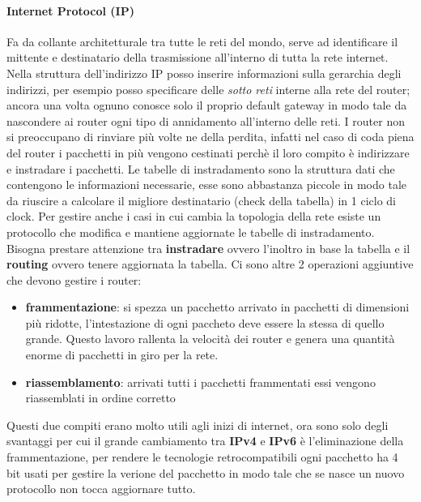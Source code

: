 \documentclass{article}
\begin{document}
\paragraph{Internet Protocol (IP)}
Fa da collante architetturale tra tutte le reti del mondo, serve ad
identificare il mittente e destinatario della trasmissione all'interno di tutta
la rete internet. Nella struttura dell'indirizzo IP posso inserire informazioni
sulla gerarchia degli indirizzi, per esempio posso specificare delle
\textit{sotto reti} interne alla rete del router; ancora una volta ognuno
conosce solo il proprio default gateway in modo tale da nascondere ai router
ogni tipo di annidamento all'interno delle reti. I router non si preoccupano di
rinviare più volte ne della perdita, infatti nel caso di coda piena del router
i pacchetti in più vengono cestinati perchè il loro compito è indirizzare e
instradare i pacchetti. Le tabelle di instradamento sono la struttura dati che
contengono le informazioni necessarie, esse sono abbastanza piccole in modo
tale da riuscire a calcolare il migliore destinatario (check della tabella) in
1 ciclo di clock. Per gestire anche i casi in cui cambia la topologia della
rete esiste un protocollo che modifica e mantiene aggiornate le tabelle di
instradamento. Bisogna prestare attenzione tra \textbf{instradare} ovvero
l'inoltro in base la tabella e il \textbf{routing} ovvero tenere aggiornata la
tabella. Ci sono altre 2 operazioni aggiuntive che devono gestire i router:

\begin{itemize}
    \item \textbf{frammentazione}: si spezza un pacchetto arrivato in pacchetti di dimensioni più ridotte,
          l'intestazione di ogni paccheto deve essere la stessa di quello grande.
          Questo lavoro rallenta la velocità dei router e genera una quantità enorme
          di pacchetti in giro per la rete.
    \item \textbf{riassemblamento}: arrivati tutti i pacchetti frammentati essi vengono riassemblati in ordine corretto
\end{itemize}

Questi due compiti erano molto utili agli inizi di internet, ora sono solo
degli svantaggi per cui il grande cambiamento tra \textbf{IPv4} e \textbf{IPv6}
è l'eliminazione della frammentazione, per rendere le tecnologie
retrocompatibili ogni pacchetto ha 4 bit usati per gestire la verione del
pacchetto in modo tale che se nasce un nuovo protocollo non tocca aggiornare
tutto.
\end{document}
